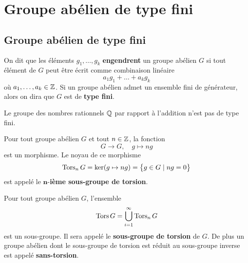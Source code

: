 \chapter{Groupe abélien de type fini}
\minisommaire
{}

\section{Groupe abélien de type fini}
\begin{definition} \label{def: Groupe de type fini}
	On dit que les éléments $g_1, \ldots, g_k$ \textbf{engendrent} un groupe abélien $G$ si tout élément de $G$ peut être écrit comme combinaison linéaire 
	\[
	a_1 g_1 + \ldots + a_k g_k
	\]
	où $a_1, \ldots ,a_k \in \mathbb{Z}$. Si un groupe abélien admet un ensemble fini de générateur, alors on dira que $G$ est de \textbf{type fini}.
\end{definition}

\begin{proposition}
	Le groupe des nombres rationnels $\mathbb{Q}$ par rapport à l'addition n'est pas de type fini.
\end{proposition}


\begin{definition}
	Pour tout groupe abélien $G$ et tout $n \in \mathbb{Z}$, la fonction
	\[
	G \to G, \quad g \mapsto ng
	\]
	est un morphisme. Le noyau de ce morphisme
	\[
	\operatorname{Tors}_n G = \ker(g \mapsto ng) = \big\{ g \in G \mid ng = 0 \big\}
	\]
	est appelé le $\bm n$-\textbf{ième sous-groupe de torsion}.
\end{definition}

\begin{proposition}
	Pour tout groupe abélien $G$, l'ensemble
	\[
	\operatorname{Tors} G = \bigcup_{i=1}^\infty \operatorname{Tors}_n G
	\]
	est un sous-groupe. Il sera appelé le \textbf{sous-groupe de torsion} de $G$. De plus un groupe abélien dont le sous-groupe de torsion est réduit au sous-groupe inverse est appelé \textbf{sans-torsion}.
\end{proposition}

